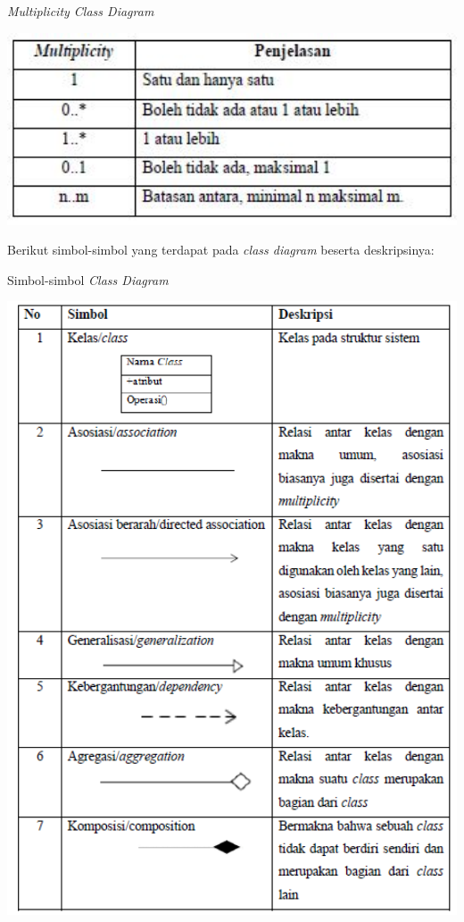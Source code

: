 \begin{table}[H]
	\centering
	\caption{\emph{Multiplicity Class Diagram}}
	\includegraphics[width=1.0\textwidth]{gambar/multiplicity}
	\label{tabel_karaktermax2}
\end{table}
Berikut simbol-simbol yang terdapat pada\textit{ class diagram} beserta deskripsinya: 
\begin{table}[H]
	\centering
	\caption{Simbol-simbol \emph{Class Diagram} \cite{Rosa}}
	\includegraphics[width=1.0\textwidth]{gambar/simbolclass}
	\label{tabel_karaktermax2}
\end{table}


